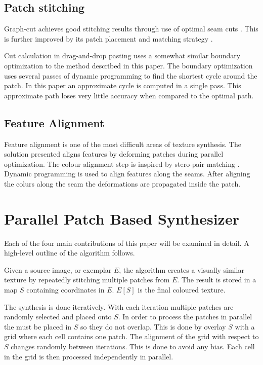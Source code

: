 \documentclass{acmsmall}
\begin{document}
\subsection{Patch stitching}
Graph-cut achieves good stitching results through use of optimal seam cuts \cite{boykov2001fast}. This is further improved by its patch placement and matching strategy \cite{kwatra2003graphcut}.

Cut calculation in drag-and-drop pasting \cite{jia2006drag} uses a somewhat similar boundary optimization to the method described in this paper. The boundary optimization uses several passes of dynamic programming to find the shortest cycle around the patch. In this paper an approximate cycle is computed in a single pass. This approximate path loses very little accuracy when compared to the optimal path.

\subsection{Feature Alignment}
Feature alignment is one of the most difficult areas of texture synthesis.
The solution presented aligns features by deforming patches during parallel optimization. The colour alignment step is inspired by stero-pair matching \cite{baker1982depth}. Dynamic programming is used to align features along the seams. After aligning the colurs along the seam the deformations are propagated inside the patch.

\section{Parallel Patch Based Synthesizer}
Each of the four main contributions of this paper will be examined in detail. A high-level outline of the algorithm follows.

Given a source image, or exemplar $E$, the algorithm creates a visually similar texture by repeatedly stitching multiple patches from $E$. The result is stored in a map $S$ containing coordinates in $E$. $E[S]$ is the final coloured texture.

The synthesis is done iteratively. With each iteration multiple patches are randomly selected and placed onto $S$. In order to process the patches in parallel the must be placed in $S$ so they do not overlap. This is done by overlay $S$ with a grid where each cell contains one patch. The alignment of the grid with respect to $S$ changes randomly between iterations. This is done to avoid any bias. Each cell in the grid is then processed independently in parallel.
\end{document}
